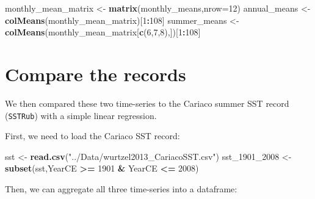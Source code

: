 \documentclass[]{article}
\newenvironment{Shaded}{\begin{snugshade}}{\end{snugshade}}
\newcommand{\KeywordTok}[1]{\textcolor[rgb]{0.13,0.29,0.53}{\textbf{#1}}}
\newcommand{\DataTypeTok}[1]{\textcolor[rgb]{0.13,0.29,0.53}{#1}}
\newcommand{\DecValTok}[1]{\textcolor[rgb]{0.00,0.00,0.81}{#1}}
\newcommand{\StringTok}[1]{\textcolor[rgb]{0.31,0.60,0.02}{#1}}
\newcommand{\OperatorTok}[1]{\textcolor[rgb]{0.81,0.36,0.00}{\textbf{#1}}}
\newcommand{\NormalTok}[1]{#1}
\begin{document}
\begin{Shaded}
\begin{Highlighting}[]
\NormalTok{monthly_mean_matrix <-}\StringTok{ }\KeywordTok{matrix}\NormalTok{(monthly_means,}\DataTypeTok{nrow=}\DecValTok{12}\NormalTok{)}
\NormalTok{annual_means <-}\StringTok{ }\KeywordTok{colMeans}\NormalTok{(monthly_mean_matrix)[}\DecValTok{1}\OperatorTok{:}\DecValTok{108}\NormalTok{]}
\NormalTok{summer_means <-}\StringTok{ }\KeywordTok{colMeans}\NormalTok{(monthly_mean_matrix[}\KeywordTok{c}\NormalTok{(}\DecValTok{6}\NormalTok{,}\DecValTok{7}\NormalTok{,}\DecValTok{8}\NormalTok{),])[}\DecValTok{1}\OperatorTok{:}\DecValTok{108}\NormalTok{]}
\end{Highlighting}
\end{Shaded}

\section{Compare the records}\label{compare-the-records}

We then compared these two time-series to the Cariaco summer SST record
(\texttt{SSTRub}) with a simple linear regression.

First, we need to load the Cariaco SST record:

\begin{Shaded}
\begin{Highlighting}[]
\NormalTok{sst <-}\StringTok{ }\KeywordTok{read.csv}\NormalTok{(}\StringTok{"../Data/wurtzel2013_CariacoSST.csv"}\NormalTok{)}
\NormalTok{sst_}\DecValTok{1901}\NormalTok{_}\DecValTok{2008}\NormalTok{ <-}\StringTok{ }\KeywordTok{subset}\NormalTok{(sst,YearCE }\OperatorTok{>=}\StringTok{ }\DecValTok{1901} \OperatorTok{&}\StringTok{ }\NormalTok{YearCE }\OperatorTok{<=}\StringTok{ }\DecValTok{2008}\NormalTok{)}
\end{Highlighting}
\end{Shaded}

Then, we can aggregate all three time-series into a dataframe:

\begin{Shaded}
\end{Shaded}
\end{document}
